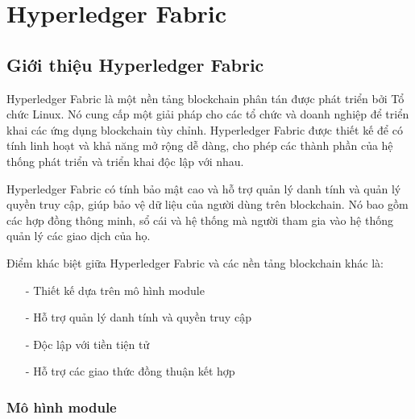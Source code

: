 \chapter{ Hyperledger Fabric}
\section{Giới thiệu Hyperledger Fabric }
Hyperledger Fabric là một nền tảng blockchain phân tán được phát triển bởi Tổ chức Linux. Nó 
cung cấp một giải pháp cho các tổ chức và doanh nghiệp để triển khai các ứng dụng blockchain 
tùy chỉnh. Hyperledger Fabric được thiết kế để có tính linh hoạt và khả năng mở rộng dễ dàng, 
cho phép các thành phần của hệ thống phát triển và triển khai độc lập với nhau.

Hyperledger Fabric có tính bảo mật cao và hỗ trợ quản lý danh tính và quản lý quyền truy cập, 
giúp bảo vệ dữ liệu của người dùng trên blockchain. Nó bao gồm các hợp đồng thông minh, sổ cái và
hệ thống mà người tham gia vào hệ thống quản lý các giao dịch của họ.

Điểm khác biệt giữa Hyperledger Fabric và các nền tảng blockchain khác là:
\begin{itemize}
    \item[-] Thiết kế dựa trên mô hình module 
    \item[-] Hỗ trợ quản lý danh tính và quyền truy cập
    \item[-] Độc lập với tiền tiện tử
    \item[-] Hỗ trợ các giao thức đồng thuận kết hợp
\end{itemize}

\subsection{Mô hình module}

